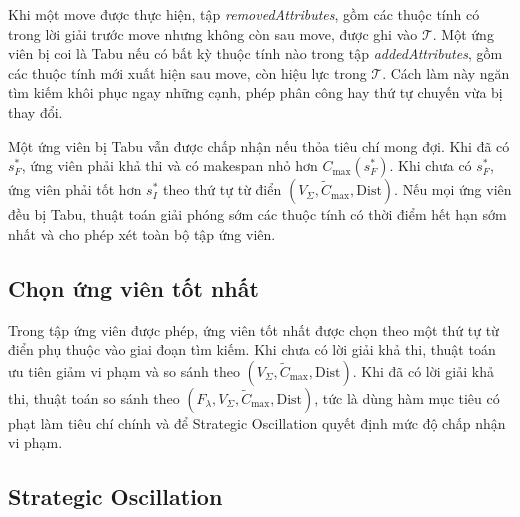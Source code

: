 \documentclass[../DoAn.tex]{subfiles}
\begin{document}
Khi một move được thực hiện, tập \textit{removedAttributes}, gồm các thuộc tính có trong lời giải trước move nhưng không còn sau move, được ghi vào $\mathcal{T}$. Một ứng viên bị coi là Tabu nếu có bất kỳ thuộc tính nào trong tập \textit{addedAttributes}, gồm các thuộc tính mới xuất hiện sau move, còn hiệu lực trong $\mathcal{T}$. Cách làm này ngăn tìm kiếm khôi phục ngay những cạnh, phép phân công hay thứ tự chuyến vừa bị thay đổi.

Một ứng viên bị Tabu vẫn được chấp nhận nếu thỏa tiêu chí mong đợi. Khi đã có $s^*_F$, ứng viên phải khả thi và có makespan nhỏ hơn $C_{\max}(s^*_F)$. Khi chưa có $s^*_F$, ứng viên phải tốt hơn $s^*_I$ theo thứ tự từ điển $(V_\Sigma, \tilde{C}_{\max}, \mathrm{Dist})$. Nếu mọi ứng viên đều bị Tabu, thuật toán giải phóng sớm các thuộc tính có thời điểm hết hạn sớm nhất và cho phép xét toàn bộ tập ứng viên.

\subsection{Chọn ứng viên tốt nhất}

Trong tập ứng viên được phép, ứng viên tốt nhất được chọn theo một thứ tự từ điển phụ thuộc vào giai đoạn tìm kiếm. Khi chưa có lời giải khả thi, thuật toán ưu tiên giảm vi phạm và so sánh theo $(V_\Sigma, \tilde{C}_{\max}, \mathrm{Dist})$. Khi đã có lời giải khả thi, thuật toán so sánh theo $(F_\lambda, V_\Sigma, \tilde{C}_{\max}, \mathrm{Dist})$, tức là dùng hàm mục tiêu có phạt làm tiêu chí chính và để Strategic Oscillation quyết định mức độ chấp nhận vi phạm.

\subsection{Strategic Oscillation}
\label{subsec:so}
\end{document}
